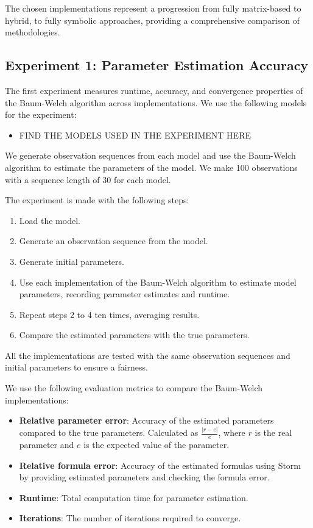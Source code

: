The chosen implementations represent a progression from fully matrix-based to hybrid, to fully symbolic approaches, providing a comprehensive comparison of methodologies.

\subsection{Experiment 1: Parameter Estimation Accuracy}
The first experiment measures runtime, accuracy, and convergence properties of the Baum-Welch algorithm across implementations.
We use the following models for the experiment:
\begin{itemize}
    \item FIND THE MODELS USED IN THE EXPERIMENT HERE
\end{itemize} 
We generate observation sequences from each model and use the Baum-Welch algorithm to estimate the parameters of the model. 
We make 100 observations with a sequence length of 30 for each model.

The experiment is made with the following steps:
\begin{enumerate}
    \item Load the model.
    \item Generate an observation sequence from the model.
    \item Generate initial parameters.
    \item Use each implementation of the Baum-Welch algorithm to estimate model parameters, recording parameter estimates and runtime.
    \item Repeat steps 2 to 4 ten times, averaging results.
    \item Compare the estimated parameters with the true parameters.
\end{enumerate}
All the implementations are tested with the same observation sequences and initial parameters to ensure a fairness.

We use the following evaluation metrics to compare the Baum-Welch implementations:
\begin{itemize}
    \item \textbf{Relative parameter error}: Accuracy of the estimated parameters compared to the true parameters.
    Calculated as $\frac{|r - e|}{e}$, where $r$ is the real parameter and $e$ is the expected value of the parameter.
    \item \textbf{Relative formula error}: Accuracy of the estimated formulas using Storm by providing estimated parameters and checking the formula error.
    \item \textbf{Runtime}: Total computation time for parameter estimation.
    \item \textbf{Iterations}: The number of iterations required to converge.
\end{itemize}

